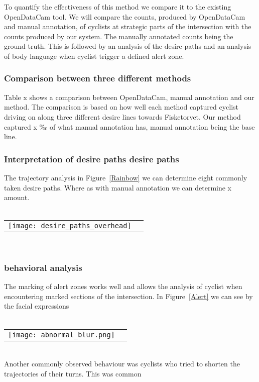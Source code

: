 To quantify the effectiveness of this method we compare it to the existing OpenDataCam tool.
We will compare the counts, produced by OpenDataCam and manual annotation, of cyclists at strategic parts of the intersection with the counts produced by our system. The manually annotated counts being the ground truth.
This is followed by an analysis of the desire paths and an analysis of body language when cyclist trigger a defined
alert zone.
\ \\ 

\subsubsection{Comparison between three different methods}
Table x shows a comparison between OpenDataCam, manual annotation and our method.
The comparison is based on how well each method captured cyclist driving on along three different 
desire lines towards Fisketorvet.
Our method captured x ‰ of what manual annotation has, manual annotation being the base line.
\ \\

\subsubsection{Interpretation of desire paths desire paths}
The trajectory analysis in Figure~\ref{Rainbow} we can determine eight commonly taken desire paths. 
Where as with manual annotation we can determine x amount.
\ \\
\raggedbottom
\ \\ 
\noindent
\begin{tabular}{@{}cc}
\texttt{[image: desire\_paths\_overhead]} 
\end{tabular}
\label{traject}

\ \\
\subsubsection{behavioral analysis}
The marking of alert zones works well and allows the analysis of cyclist when encountering marked sections of the 
intersection. In Figure~\ref{Alert} we can see by the facial expressions 
\ \\
\raggedbottom
\ \\ 
\noindent
\begin{tabular}{@{}cc}
\texttt{[image: abnormal\_blur.png]} 
\end{tabular}
\label{Alert}
\ \\


Another commonly observed behaviour was cyclists who tried to shorten the trajectories of their turns.
This was common
